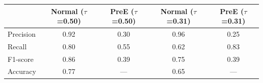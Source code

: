 \documentclass[border=10pt]{standalone}
\begin{document}
\begin{tabular}{lcccc}
\toprule
 & \textbf{Normal ($\tau$=0.50)} & \textbf{PreE ($\tau$=0.50)} & \textbf{Normal ($\tau$=0.31)} & \textbf{PreE ($\tau$=0.31)} \\
\midrule
Precision  & 0.92 & 0.30 & 0.96 & 0.25 \\
Recall     & 0.80 & 0.55 & 0.62 & 0.83 \\
F1-score   & 0.86 & 0.39 & 0.75 & 0.39 \\
Accuracy   & 0.77 & ---  & 0.65 & ---  \\
\bottomrule
\end{tabular}
\end{document}
